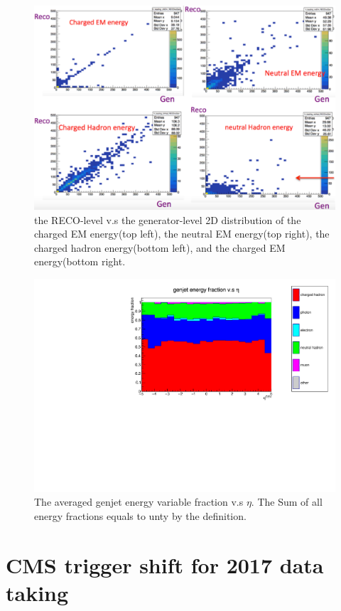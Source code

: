 \documentclass{article}
\begin{document}
\begin{figure}
\centering
\includegraphics[width=.7\textwidth]{figures/genjet_variables_RecovsGen.pdf}
\caption{the RECO-level v.s the generator-level 2D distribution of the charged EM energy(top left), the neutral EM energy(top right), the charged hadron energy(bottom left), and the charged EM energy(bottom right.}
\label{pics:blablabla}
\end{figure}

\begin{figure}
\centering
\includegraphics[width=1.\textwidth]{figures/genjet_energy_fraction_20Bins.pdf}
\caption{The averaged genjet energy variable fraction v.s $\eta$. The Sum of all energy fractions equals to unty by the definition.}
\label{pics:blablabla}
\end{figure}



\section{CMS trigger shift for 2017 data taking}
\end{document}
